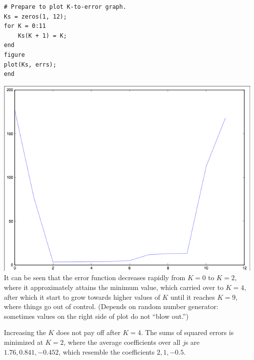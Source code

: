 \documentclass[10pt]{article}
\begin{document}
\begin{itemize}
\begin{verbatim}
# Prepare to plot K-to-error graph.
Ks = zeros(1, 12);
for K = 0:11
    Ks(K + 1) = K;
end
figure
plot(Ks, errs);
end
  \end{verbatim}
  \includegraphics[width=\textwidth,height=\textheight,keepaspectratio]{KsVersusErrors}
  It can be seen that the error function decreases rapidly from $K = 0$ to $K = 2$, where it approximately attains the minimum value, which carried over to $K = 4$, after which it start to grow towards higher values of $K$ until it reaches $K = 9$, where things go out of control. (Depends on random number generator: sometimes values on the right side of plot do not ``blow out.'')
  
  Increasing the $K$ does not pay off after $K = 4$. The sums of squared errors is minimized at $K = 2$, where the average coefficients over all $j$s are $1.76, 0.841, -0.452$, which resemble the coefficients $2, 1, -0.5$.
  
\end{itemize}
\end{document}
